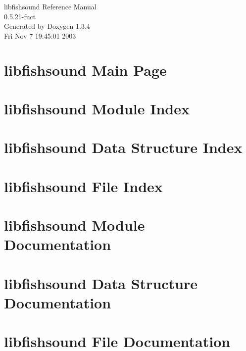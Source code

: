 \documentclass[a4paper]{book}
\begin{document}
\begin{titlepage}
\vspace*{7cm}
\begin{center}
{\Large libfishsound Reference Manual\\[1ex]\large 0.5.21-fuct }\\
\vspace*{1cm}
{\large Generated by Doxygen 1.3.4}\\
\vspace*{0.5cm}
{\small Fri Nov 7 19:45:01 2003}\\
\end{center}
\end{titlepage}
\clearemptydoublepage
{}
\tableofcontents
\clearemptydoublepage
{}
\chapter{libfishsound Main Page}
\label{index}
\chapter{libfishsound Module Index}

\chapter{libfishsound Data Structure Index}

\chapter{libfishsound File Index}

\chapter{libfishsound Module Documentation}




\chapter{libfishsound Data Structure Documentation}


\chapter{libfishsound File Documentation}


\printindex
\end{document}
